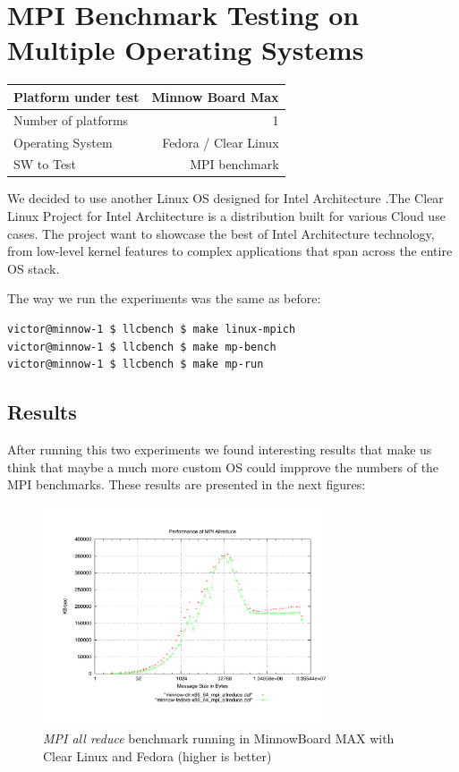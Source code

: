 \section{MPI Benchmark Testing on Multiple Operating Systems}

    \begin{center}
    \begin{tabular}{ | l | r |}
        \hline
        Platform under test & Minnow Board  Max \\ \hline
        Number of platforms  & 1  \\ \hline
        Operating System & Fedora / Clear Linux  \\ \hline
        SW to Test & MPI benchmark \\ \hline
    \end{tabular}
    \end{center}


We decided to use another Linux OS designed for Intel Architecture
\cite{clear-linux}.The Clear Linux Project for Intel Architecture is a
distribution built for various Cloud use cases. The project  want to showcase
the best of Intel Architecture technology, from low-level kernel features to
complex applications that span across the entire OS stack.

The way we run the experiments was the same as before: 

\begin{lstlisting}[frame=single,language=bash]
victor@minnow-1 $ llcbench $ make linux-mpich
victor@minnow-1 $ llcbench $ make mp-bench
victor@minnow-1 $ llcbench $ make mp-run
\end{lstlisting}

\subsection{Results}

After running this two experiments we found interesting results that make us
think that maybe a much more custom OS could impprove the numbers of the MPI
benchmarks. These results are presented in the next figures:

\begin{figure}[H]
\centering
\includegraphics[width=0.75\textwidth]{images/mpbench_clr_experiments/mpi_allreduce.pdf}
\caption{\textit{MPI all reduce} benchmark running in MinnowBoard MAX with Clear Linux and
Fedora (higher is better)}
\label{mpi_allreduce_clr_fedora}
\end{figure}

